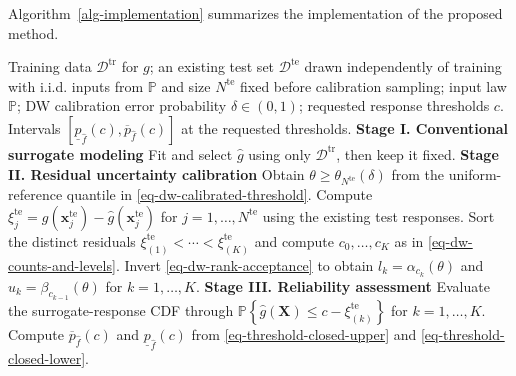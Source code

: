 \documentclass[review,11pt,3p,authoryear,nopreprintline]{elsarticle}
\begin{document}
Algorithm~\ref{alg-implementation} summarizes the implementation of the proposed method.

\begin{algorithm}[H]
  \caption{Residual calibration and reliability assessment within a surrogate workflow}
  \label{alg-implementation}
  \small
  \begin{algorithmic}[1]
    \Require Training data $\mathcal D^{\mathrm{tr}}$ for $g$; an existing test set $\mathcal D^{\mathrm{te}}$ drawn independently of training with i.i.d. inputs from $\mathbb P$ and size $N^{\mathrm{te}}$ fixed before calibration sampling; input law $\mathbb P$; DW calibration error probability $\delta\in(0,1)$; requested response thresholds $c$.
    \Ensure Intervals $\left[\underline p_{\hat f}(c),\overline p_{\hat f}(c)\right]$ at the requested thresholds.
    \Statex \textbf{Stage I. Conventional surrogate modeling}
    \State Fit and select $\hat g$ using only $\mathcal D^{\mathrm{tr}}$, then keep it fixed.
    \Statex \textbf{Stage II. Residual uncertainty calibration}
    \State Obtain $\theta\ge\theta_{N^{\mathrm{te}}}(\delta)$ from the uniform-reference quantile in \eqref{eq-dw-calibrated-threshold}.
    \State Compute $\xi_j^{\mathrm{te}}=g(\bm x_j^{\mathrm{te}})-\hat g(\bm x_j^{\mathrm{te}})$ for $j=1,\ldots,N^{\mathrm{te}}$ using the existing test responses.
    \State Sort the distinct residuals $\xi_{(1)}^{\mathrm{te}}<\cdots<\xi_{(K)}^{\mathrm{te}}$ and compute $c_0,\ldots,c_K$ as in \eqref{eq-dw-counts-and-levels}.
    \State Invert \eqref{eq-dw-rank-acceptance} to obtain $l_k=\alpha_{c_k}(\theta)$ and $u_k=\beta_{c_{k-1}}(\theta)$ for $k=1,\ldots,K$.
    \Statex \textbf{Stage III. Reliability assessment}
      \State Evaluate the surrogate-response CDF through $\mathbb P\left\{\hat g(\bm X)\le c-\xi_{(k)}^{\mathrm{te}}\right\}$ for $k=1,\ldots,K$.
      \State Compute $\overline p_{\hat f}(c)$ and $\underline p_{\hat f}(c)$ from \eqref{eq-threshold-closed-upper} and \eqref{eq-threshold-closed-lower}.
    \EndFor
  \end{algorithmic}
\end{algorithm}
\end{document}
